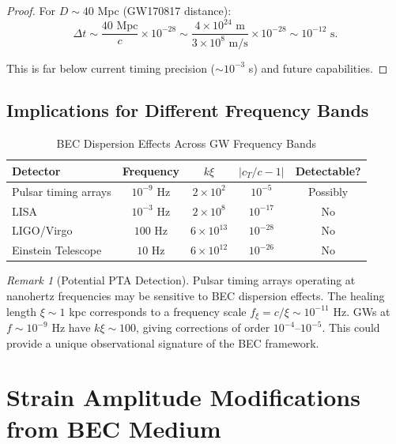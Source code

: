 \documentclass[11pt,a4paper]{article}
\newcommand{\cT}{\ensuremath{c_T}}
\theoremstyle{definition}
\theoremstyle{remark}
\newtheorem{remark}[theorem]{Remark}
\begin{document}
\begin{proof}
For $D \sim 40$ Mpc (GW170817 distance):
\begin{equation}
\Delta t \sim \frac{40 \text{ Mpc}}{c} \times 10^{-28} \sim \frac{4 \times 10^{24} \text{ m}}{3 \times 10^8 \text{ m/s}} \times 10^{-28} \sim 10^{-12} \text{ s}.
\end{equation}

This is far below current timing precision ($\sim 10^{-3}$ s) and future capabilities. \qedhere
\end{proof}

\subsection{Implications for Different Frequency Bands}
\label{sec:frequency_bands}

\begin{table}[H]
\centering
\caption{BEC Dispersion Effects Across GW Frequency Bands}
\label{tab:dispersion}
\begin{tabular}{@{}lcccc@{}}
\toprule
\textbf{Detector} & \textbf{Frequency} & \textbf{$k\xi$} & \textbf{$|\cT/c - 1|$} & \textbf{Detectable?} \\
\midrule
Pulsar timing arrays & $10^{-9}$ Hz & $2 \times 10^{2}$ & $10^{-5}$ & Possibly \\
LISA & $10^{-3}$ Hz & $2 \times 10^{8}$ & $10^{-17}$ & No \\
LIGO/Virgo & $100$ Hz & $6 \times 10^{13}$ & $10^{-28}$ & No \\
Einstein Telescope & $10$ Hz & $6 \times 10^{12}$ & $10^{-26}$ & No \\
\bottomrule
\end{tabular}
\end{table}

\begin{remark}[Potential PTA Detection]
Pulsar timing arrays operating at nanohertz frequencies may be sensitive to BEC dispersion effects. The healing length $\xi \sim 1$ kpc corresponds to a frequency scale $f_\xi = c/\xi \sim 10^{-11}$ Hz. GWs at $f \sim 10^{-9}$ Hz have $k\xi \sim 100$, giving corrections of order $10^{-4}$--$10^{-5}$. This could provide a unique observational signature of the BEC framework.
\end{remark}

\section{Strain Amplitude Modifications from BEC Medium}
\label{sec:strain_amplitude}
\end{document}
